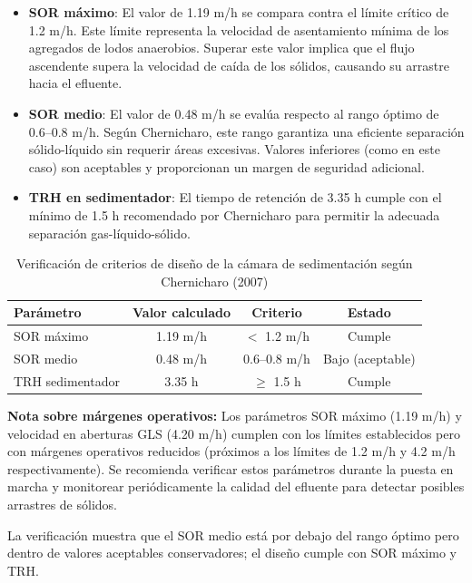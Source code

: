 \documentclass[12pt,a4paper]{article}
\begin{document}
\begin{itemize}[leftmargin=2em]
    \item \textbf{SOR máximo}: El valor de 1.19 m/h se compara contra el límite crítico de 1.2 m/h. Este límite representa la velocidad de asentamiento mínima de los agregados de lodos anaerobios. Superar este valor implica que el flujo ascendente supera la velocidad de caída de los sólidos, causando su arrastre hacia el efluente.
    
    \item \textbf{SOR medio}: El valor de 0.48 m/h se evalúa respecto al rango óptimo de 0.6--0.8 m/h. Según Chernicharo, este rango garantiza una eficiente separación sólido-líquido sin requerir áreas excesivas. Valores inferiores (como en este caso) son aceptables y proporcionan un margen de seguridad adicional.
    
    \item \textbf{TRH en sedimentador}: El tiempo de retención de 3.35 h cumple con el mínimo de 1.5 h recomendado por Chernicharo para permitir la adecuada separación gas-líquido-sólido.
\end{itemize}

\begin{table}[H]
\centering
\caption{Verificación de criterios de diseño de la cámara de sedimentación según Chernicharo (2007)}
\begin{tabular}{lccc}
\toprule
\textbf{Parámetro} & \textbf{Valor calculado} & \textbf{Criterio} & \textbf{Estado} \\
\midrule
SOR máximo & 1.19 m/h & $<$ 1.2 m/h & Cumple \\
SOR medio & 0.48 m/h & 0.6--0.8 m/h & Bajo (aceptable) \\
TRH sedimentador & 3.35 h & $\geq$ 1.5 h & Cumple \\
\bottomrule
\end{tabular}
\end{table}

\textbf{Nota sobre márgenes operativos:} Los parámetros SOR máximo (1.19 m/h) y velocidad en aberturas GLS (4.20 m/h) cumplen con los límites establecidos pero con márgenes operativos reducidos (próximos a los límites de 1.2 m/h y 4.2 m/h respectivamente). Se recomienda verificar estos parámetros durante la puesta en marcha y monitorear periódicamente la calidad del efluente para detectar posibles arrastres de sólidos.

La verificación muestra que el SOR medio está por debajo del rango óptimo pero dentro de valores aceptables conservadores; el diseño cumple con SOR máximo y TRH.
\end{document}
